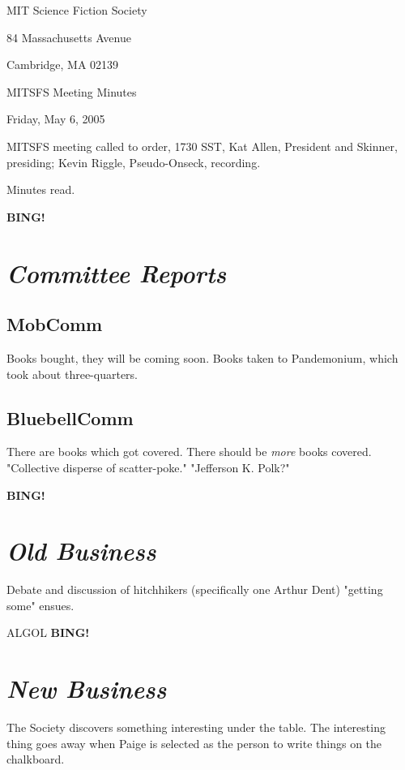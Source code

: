\documentclass[10pt]{article}
\newcommand{\bing}{{\bf BING!} }
\newcommand{\goto}[1]{\bing \vskip 12pt \section*{{\em{#1}}}}
\begin{document}
\begin{center}

MIT Science Fiction Society

84 Massachusetts Avenue

Cambridge, MA 02139

\vspace{12pt}

MITSFS Meeting Minutes

Friday, May 6, 2005

\end{center}

\vspace{18pt}

\setlength{\parskip}{6pt}

\noindent
MITSFS meeting called to order, 1730 SST, Kat Allen, President and
Skinner, presiding; Kevin Riggle, Pseudo-Onseck, recording.

Minutes read.

\goto{Committee Reports}

\subsection*{MobComm}
Books bought, they will be coming soon.  Books taken to Pandemonium, which
took about three-quarters.

\subsection*{BluebellComm}
There are books which got covered.  There should be \emph{more} books covered.
"Collective disperse of scatter-poke."  "Jefferson K. Polk?"



\goto{Old Business}

Debate and discussion of hitchhikers (specifically one Arthur Dent) "getting
some" ensues.

ALGOL
\goto{New Business}

The Society discovers something interesting under the table.  The interesting
thing goes away when Paige is selected as the person to write things on the
chalkboard.
\end{document}
